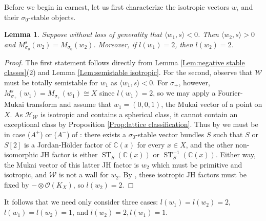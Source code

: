 \documentclass[leqno,11pt]{amsart}
\def\C{\ensuremath{\mathbb{C}}}
\def\ST{\mathop{\mathrm{ST}}\nolimits}
\newtheorem{Lem}[Thm]{Lemma}
\theoremstyle{definition}
\def\C{\ensuremath{\mathbb{C}}}
\def\HH{\ensuremath{\mathcal H}}
\def\OO{\ensuremath{\mathcal O}}
\def\WW{\ensuremath{\mathcal W}}
\begin{document}
Before we begin in earnest, let us first characterize the isotropic vectors $w_i$ and their $\sigma_0$-stable objects.
\begin{Lem}\label{Lem: spherical isotropic classes}
Suppose without loss of generality that $\langle w_1,s\rangle <0$.  Then $\langle w_2,s\rangle> 0$ and $M_{\sigma_0}^s(w_2)=M_{\sigma_0}(w_2)$. Moreover, if $l(w_1)=2$, then $l(w_2)=2$.
\end{Lem}
\begin{proof}
The first statement follows directly from Lemma \ref{Lem:negative stable classes}(2) and Lemma \ref{Lem:semistable isotropic}.  For the second, observe that $\WW$ must be totally semistable for $w_1$ as $\langle w_1,s\rangle<0$.  For $\sigma_+$, however, $M_{\sigma_+}^s(w_1)=M_{\sigma_+}(w_1)\cong X$ since $l(w_1)=2$, so we may apply a Fourier-Mukai transform and assume that $w_1=(0,0,1)$, the Mukai vector of a point on $X$.  As $\HH_{\WW}$ is isotropic and contains a spherical class, it cannot contain an exceptional class by Proposition \ref{Prop:lattice classification}.  Thus by \cite[Proposition 4.5]{Yos16b} we must be in case ($A^+$) or ($A^-$) of \cite[Theorem 12.1]{Bri08}: there exists a $\sigma_0$-stable vector bundles $S$ such that $S$ or $S[2]$ is a Jordan-H\"{o}lder factor of $\C(x)$ for every $x\in X$, and the other non-isomorphic JH factor is either $\ST_S(\C(x))$ or $\ST_S^{-1}(\C(x))$.  Either way, the Mukai vector of this latter JH factor is $w_2$ which must be primitive and isotropic, and $\WW$ is not a wall for $w_2$.  By \cite[Lemma 4.6]{Yos16b}, these isotropic JH factors must be fixed by $-\otimes\OO(K_X)$, so $l(w_2)=2$.
\end{proof}

It follows that we need only consider three cases: $l(w_1)=l(w_2)=2$, $l(w_1)=l(w_2)=1$, and $l(w_2)=2,l(w_1)=1$.
\end{document}
